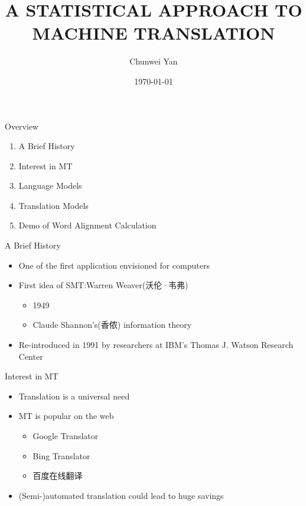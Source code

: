 \documentclass{beamer}
\title{A STATISTICAL APPROACH TO MACHINE TRANSLATION}
\author{Chunwei Yan}
\institute[PKUSZ]{
\texttt{superjom@sz.pku.edu.cn}
}
\date{\today}
\begin{document}
\begin{frame}[plain]
  \titlepage
\end{frame}

\begin{frame}{Overview}
    \begin{enumerate}
    \item A Brief History
    \item Interest in MT
    \item Language Models
    \item Translation Models
    \item Demo of Word Alignment Calculation
    \end{enumerate}
\end{frame}


\begin{frame}{A Brief History}
    \begin{itemize}
        \item One of the first application envisioned for computers
        \pause
        \item First idea  of SMT:Warren Weaver(沃伦·韦弗)
            \begin{itemize}
                \item 1949
                \item Claude Shannon's(香侬) information theory
            \end{itemize}
        \pause
        \item Re-introduced in 1991 by researchers at IBM's Thomas J. Watson Research Center
    \end{itemize}
\end{frame}

\begin{frame}{Interest in MT}
    \begin{itemize}
        \item Translation is a universal need
        \item MT is popular on the web
            \begin{itemize}
                \item Google Translator
                \item Bing Translator
                \item 百度在线翻译
            \end{itemize}
        \item (Semi-)automated translation could lead to huge savings
    \end{itemize}
\end{frame}
\end{document}
